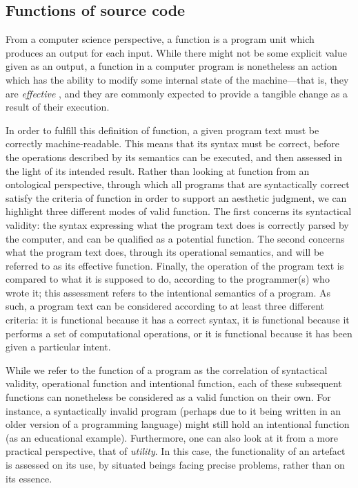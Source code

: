 \subsection{Functions of source code}
\label{subsec:functions-source-code}

From a computer science perspective, a function is a program unit which produces an output for each input. While there might not be some explicit value given as an output, a function in a computer program is nonetheless an action which has the ability to modify some internal state of the machine—that is, they are \emph{effective} \citep{abelson_structure_1979}, and they are commonly expected to provide a tangible change as a result of their execution.

In order to fulfill this definition of function, a given program text must be correctly machine-readable. This means that its syntax must be correct, before the operations described by its semantics can be executed, and then assessed in the light of its intended result. Rather than looking at function from an ontological perspective, through which all programs that are syntactically correct satisfy the criteria of function in order to support an aesthetic judgment, we can highlight three different modes of valid function. The first concerns its syntactical validity: the syntax expressing what the program text does is correctly parsed by the computer, and can be qualified as a potential function. The second concerns what the program text does, through its operational semantics, and will be referred to as its effective function. Finally, the operation of the program text is compared to what it is supposed to do, according to the programmer(s) who wrote it; this assessment refers to the intentional semantics of a program. As such, a program text can be considered according to at least three different criteria: it is functional because it has a correct syntax, it is functional because it performs a set of computational operations, or it is functional because it has been given a particular intent.

While we refer to the function of a program as the correlation of syntactical validity, operational function and intentional function, each of these subsequent functions can nonetheless be considered as a valid function on their own. For instance, a syntactically invalid program (perhaps due to it being written in an older version of a programming language) might still hold an intentional function (as an educational example).  Furthermore, one can also look at it from a more practical perspective, that of \emph{utility}. In this case, the functionality of an artefact is assessed on its use, by situated beings facing precise problems, rather than on its essence.

